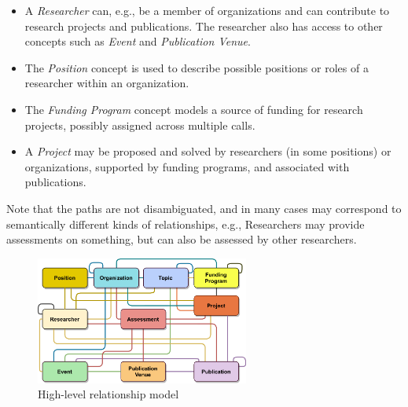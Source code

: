 \begin{itemize}
    \item A \textit{Researcher} %
    can, e.g., be a member of organizations and can contribute to research projects and publications. %
    The researcher also has access to other concepts such as \textit{Event} and \textit{Publication Venue}.
    
    \item The \textit{Position} concept is used to describe possible positions or roles of a researcher within an organization.%
    
    \item The \textit{Funding Program} concept models a source of funding for research projects, possibly assigned across multiple calls.

    \item A \textit{Project}  %
    may be proposed and solved by researchers (in some positions) or organizations,  supported by funding programs, and associated with publications.%
    
    
\end{itemize}

Note that the paths are not disambiguated, and in many cases may correspond to semantically different kinds of relationships, e.g., Researchers may provide assessments on something, but can also be assessed by other researchers.

\begin{figure}
\centering
\includegraphics[width=7cm]{figures/relationship-model.eps}
\caption{High-level relationship model} \label{relationship-model}
\end{figure}
